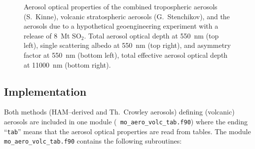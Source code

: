 \begin{appendix}
\begin{figure}[htb]
\vspace{-3.5cm}
\pctfour
{\vspace{-2.7cm}\hspace{-1cm}}
{\vspace{-2.7cm}}
{\vspace{-0.7cm}\hspace{-1cm}}
{\vspace{-0.7cm}}
\caption{Aerosol optical properties of the combined tropospheric
  aerosols (S.~Kinne), volcanic stratospheric aerosols
  (G.~Stenchikov), and the aerosols due to a hypothetical
  geoengineering experiment with a release of 8~Mt SO$_2$. Total
  aerosol optical depth at 550~nm (top left), single scattering albedo
  at 550~nm (top right), and asymmetry factor at 550~nm (bottom left),
  total effective aerosol optical depth at 11000~nm (bottom
  right).}\label{fig_crowaero_clim}
\end{figure}


\subsection{Implementation}

Both methods (HAM--derived and Th.~Crowley aerosols) defining
(volcanic) aerosols are included in one module ({\tt
  mo\_aero\_volc\_tab.f90}) where the ending ``{\tt tab}'' means that
the aerosol 
optical properties are read from tables.
The module {\tt mo\_aero\_volc\_tab.f90} contains the following
subroutines:


\end{appendix}
